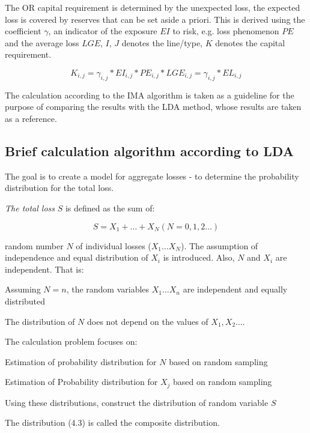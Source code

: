 \documentclass{article}
\begin{document}
The OR capital requirement is determined by the unexpected loss, the expected loss is covered by reserves that can be set aside a priori. This is derived using the coefficient $\gamma$, an indicator of the exposure $EI$ to risk, e.g. loss phenomenon $PE$ and the average loss $LGE$, $I$, $J$ denotes the line/type, $K$ denotes the capital requirement.

\begin{equation}
  K_{i,j} = \gamma_{i,j} * EI_{i,j} * PE_{i,j} * LGE_{i,j} = \gamma_{i,j} * EL_{i,j}
\end{equation}


The calculation according to the IMA algorithm is taken as a guideline for the purpose of comparing the results with the LDA method, whose results are taken as a reference.

\subsection{Brief calculation algorithm according to LDA}

The goal is to create a model for aggregate losses - to determine the probability distribution for the total loss.

\emph{The total loss} $S$ is defined as the sum of:

\begin{equation}
  S = X_1+…+X_N (N = 0,1,2 \ldots)
\end{equation}

random number $N$ of individual losses ($X_1 \ldots X_N$). The assumption of independence and equal distribution of $X_i$ is introduced. Also, $N$ and $X_i$ are independent. That is:

\begin{compactitem}
\item Assuming $N = n$, the random variables $X_1 \ldots X_n$ are independent and equally distributed
\item The distribution of $N$ does not depend on the values of $X_1,X_2 \ldots$.
\end{compactitem}

The calculation problem focuses on:
\begin{compactitem}
\item Estimation of probability distribution for $N$ based on random sampling
\item Estimation of Probability distribution for $X_j$ based on random sampling
\item Using these distributions, construct the distribution of random variable $S$
\item The distribution (4.3) is called the composite distribution.
\end{compactitem}
\end{document}
